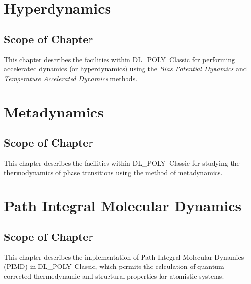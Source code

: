\documentclass[11pt,a4paper,dvipdfmx]{report}
\newcommand{\D}{\mbox{DL\_POLY Classic}}
\begin{document}
\chapter{Hyperdynamics}
\label{hyperdynamics}
\setcounter{equation}{0}
\newpage
\section*{Scope of Chapter}
This chapter describes the facilities within \D{} for performing
accelerated dynamics (or hyperdynamics) using the {\em Bias Potential
Dynamics} and {\em Temperature Accelerated Dynamics} methods.
\newpage

\newpage

\chapter{Metadynamics}
\label{metadynamics}
\setcounter{equation}{0}
\newpage
\section*{Scope of Chapter}
This chapter describes the facilities within \D{} for studying the 
thermodynamics of phase transitions using the method of metadynamics.
\newpage

\newpage

\chapter{Path Integral Molecular Dynamics}
\label{pimd}
\setcounter{equation}{0}
\newpage
\section*{Scope of Chapter}
This chapter describes the implementation of Path Integral Molecular
Dynamics (PIMD) in \D{}, which permits the calculation of quantum
corrected thermodynamic and structural properties for atomistic
systems.
\newpage

\newpage

\begin{comment}
\chapter{The Java GUI}
\label{javagui}
\setcounter{equation}{0}
\newpage
\section*{Scope of Chapter}
This chapter describes the \D{} Java Graphical User Interface which
offers utilities for running \D{}, constructing example input files
and performing basic analysis of \D{} output.
\newpage

\newpage
\end{comment}
\end{document}
